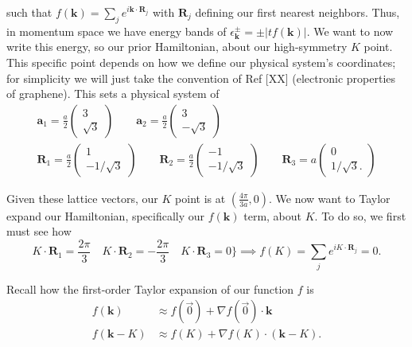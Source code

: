 \documentclass[12pt]{revtex4-2}
\begin{document}
such that $f(\mathbf{k}) = \sum_j e^{i\mathbf{k}\cdot \mathbf{R}_j}$ with $\mathbf{R}_j$ defining our first nearest neighbors.  Thus, in momentum space we have energy bands of $\epsilon_\mathbf{k}^\pm = \pm|tf(\mathbf{k})|$.  We want to now write this energy, so our prior Hamiltonian, about our high-symmetry $K$ point.  This specific point depends on how we define our physical system's coordinates; for simplicity we will just take the convention of Ref [XX] (electronic properties of graphene).  This sets a physical system of
\begin{gather}
    \mathbf{a}_1 = \frac{a}{2} \begin{pmatrix}
        3 \\ \sqrt{3}
    \end{pmatrix} \qquad \mathbf{a}_2 = \frac{a}{2} \begin{pmatrix}
        3 \\ -\sqrt{3}
    \end{pmatrix} \\
    \mathbf{R}_1 = \frac{a}{2} \begin{pmatrix}
        1 \\ -1/\sqrt{3}
    \end{pmatrix} \qquad \mathbf{R}_2 = \frac{a}{2} \begin{pmatrix}
        -1 \\ -1/\sqrt{3}
    \end{pmatrix} \qquad \mathbf{R}_3 = a \begin{pmatrix}
        0 \\ 1/\sqrt{3}.
    \end{pmatrix}
\end{gather}

Given these lattice vectors, our $K$ point is at $( \frac{4\pi}{3a},0)$.  We now want to Taylor expand our Hamiltonian, specifically our $f(\mathbf{k})$ term, about $K$.  To do so, we first must see how
\begin{equation}
    K \cdot \mathbf{R}_1 = \frac{2\pi}{3} \quad K \cdot \mathbf{R}_2 = -\frac{2\pi}{3} \quad K \cdot \mathbf{R}_3 = 0 
    \Bigg\} \implies f(K) = \sum_j e^{i K \cdot \mathbf{R}_j} = 0.
\end{equation}

Recall how the first-order Taylor expansion of our function $f$ is
\begin{align}
    f(\mathbf{k}) &\approx f(\vec{0}) + \nabla f(\vec{0}) \cdot \mathbf{k} \\
    f(\mathbf{k}-K) &\approx f(K) + \nabla f(K) \cdot (\mathbf{k}-K).
\end{align}
\end{document}
